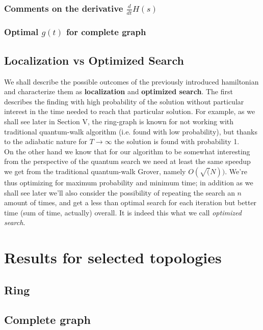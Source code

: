 \documentclass[aps,pra,reprint]{revtex4-2}
\begin{document}
\subsubsection{Comments on the derivative $\frac{d}{dt}H(s)$}
\subsubsection{Optimal $g(t)$ for complete graph}

\subsection{Localization vs Optimized Search}
We shall describe the possible outcomes of the previously introduced hamiltonian and characterize them as \textbf{localization} and \textbf{optimized search}. The first describes the finding with high probability of the solution without particular interest in the time needed to reach that particular solution. For example, as we shall see later in Section V, the ring-graph is known for not working with traditional quantum-walk algorithm (i.e. found with low probability), but thanks to the adiabatic nature for $T \to \infty$ the solution is found with probability 1. \\

On the other hand we know that for our algorithm to be somewhat interesting from the perspective of the quantum search we need at least the same speedup we get from the traditional quantum-walk Grover, namely $O(\sqrt(N))$. We're thus optimizing for maximum probability and minimum time; in addition as we shall see later we'll also consider the possibility of repeating the search an $n$ amount of times, and get a less than optimal search for each iteration but better time (sum of time, actually) overall. It is indeed this what we call \textit{optimized search}.


\section{Results for selected topologies}
\subsection{Ring}
\subsection{Complete graph} 
\end{document}
